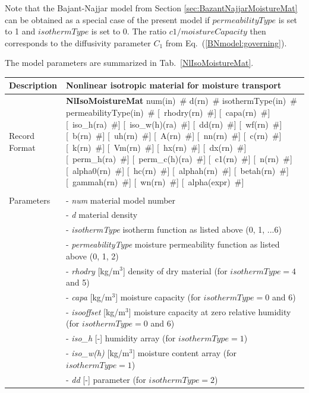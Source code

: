 \documentclass[a4paper]{article}
\newcommand{\descitem}[1]{{\noindent \bf #1}}
\newcommand{\elemparam}[2]{{{#1\tiny (#2)}~\#}}
\newcommand{\optelemparam}[2]{[{~\elemparam{#1}{#2}}]}
\newcommand{\param}[1]{{\it #1}}
\newcommand{\refeq}[1]{Eq.~(\ref{#1})}
\newenvironment{mmt}{\begin{tabular}{|l|p{9cm}|}}{\end{tabular}\\}
\newenvironment{mmt}{\begin{tabular}{|l|l|}}{\end{tabular}\\}
\begin{document}
Note that the Bajant-Najjar 
model from Section \ref{sec:BazantNajjarMoistureMat} 
can be obtained as a special
case of the present model if $permeabilityType$ is set to 1
and $isothermType$ is set to 0. 
The ratio $c1/moistureCapacity$ then corresponds to the diffusivity
parameter $C_1$ from \refeq{BNmodel:governing}.

The model parameters are summarized in Tab.~\ref{NlIsoMoistureMat}.
\begin{table}[!htb]
\begin{mmt}
\hline
Description & Nonlinear isotropic material for moisture transport \\
\hline
Record Format & \descitem{NlIsoMoistureMat} \elemparam{num}{in}
\elemparam{d}{rn} \elemparam{isothermType}{in} \elemparam{permeabilityType}{in}
\optelemparam{rhodry}{rn} \optelemparam{capa}{rn}
\optelemparam{iso\_h}{ra} \optelemparam{iso\_w(h)}{ra}
\optelemparam{dd}{rn} \optelemparam{wf}{rn} \optelemparam{b}{rn}
\optelemparam{uh}{rn} \optelemparam{A}{rn} \optelemparam{nn}{rn}
\optelemparam{c}{rn} \optelemparam{k}{rn} \optelemparam{Vm}{rn}
\optelemparam{hx}{rn} \optelemparam{dx}{rn}
\optelemparam{perm\_h}{ra} \optelemparam{perm\_c(h)}{ra}
\optelemparam{c1}{rn} \optelemparam{n}{rn} \optelemparam{alpha0}{rn}
\optelemparam{hc}{rn} \optelemparam{alphah}{rn}
\optelemparam{betah}{rn} \optelemparam{gammah}{rn}
\optelemparam{wn}{rn} \optelemparam{alpha}{expr} \\
\\
Parameters &- \param{num} material model number \\
&- \param{d} material density \\
&- \param{isothermType} isotherm function as listed above (0, 1, ...6)
\\
&- \param{permeabilityType} moisture permeability function as listed
above (0, 1, 2) \\
&- \param{rhodry} [kg/m$^3$] density of dry material (for $isothermType=4$ and 5) \\
&- \param{capa} [kg/m$^3$] moisture capacity (for $isothermType=0$ and
6) \\
&- \param{isooffset} [kg/m$^3$] moisture capacity at zero relative
humidity (for $isothermType=0$ and 6) \\
&- \param{iso\_h} [-] humidity array (for $isothermType=1$) \\
&- \param{iso\_w(h)} [kg/m$^3$] moisture content array (for
$isothermType=1$) \\
&- \param{dd} [-] parameter (for $isothermType=2$)\\

\end{mmt}
\end{table}
\end{document}
